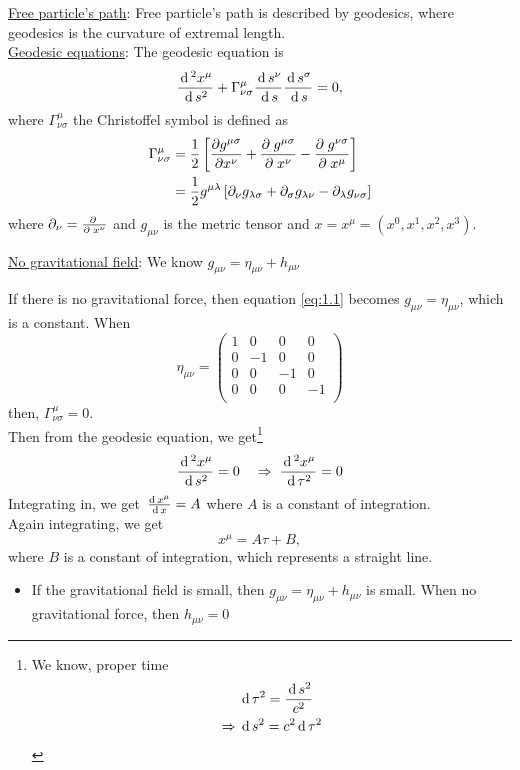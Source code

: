 \documentclass[../main-sheet.tex]{subfiles}
\begin{document}
\begin{soln}
    \underline{Free particle's path}: Free particle's path is described by geodesics, where geodesics is the curvature of extremal length.\\
    \underline{Geodesic equations}: The geodesic equation is
    \[
        \frac{\,\mathrm{d}\,^2 x^\mu}{\,\mathrm{d}\, s^2}+\Gamma^\mu_{\nu\sigma}\frac{\,\mathrm{d}\, s^\nu}{\,\mathrm{d}\, s}\frac{\,\mathrm{d}\, s^\sigma}{\,\mathrm{d}\, s}=0,
        \]
        where \(\Gamma^\mu_{\nu\sigma}\) the Christoffel symbol is defined as
        \begin{align*}
            \Gamma^\mu_{\nu\sigma}&=\frac{1}{2}\left[ \frac{\partial g^{\mu\sigma}}{\partial x^\nu}+\frac{\partial\;g^{\mu\sigma}}{\partial\; x^\nu}-\frac{\partial\;g^{\nu\sigma}}{\partial\; x^\mu} \right]\\
            &=\frac{1}{2}g^{\mu\lambda}\left[ \partial_\nu g_{\lambda\sigma}+\partial_\sigma{g_{\lambda\nu}}-\partial_\lambda{g_{\nu\sigma}} \right]
        \end{align*} 
        where \(\partial_\nu=\frac{\partial\;}{\partial\; x^\nu}\) and \(g_{\mu\nu}\) is the metric tensor and \(x = x^\mu= (x^0, x^1, x^2, x^3)\).


\underline{No gravitational field}: We know \(g_{\mu\nu}=\eta_{\mu\nu}+h_{\mu\nu}\)

If there is no gravitational force, then equation \eqref{eq:1.1} becomes \(g_{\mu\nu}=\eta_{\mu\nu}\), which is a constant. When
\[
    \eta_{\mu\nu}=
    \begin{pmatrix}
        1 & 0 & 0 & 0 \\
        0 & -1 & 0 & 0 \\
        0 & 0 & -1 & 0 \\
        0 & 0 & 0 & -1 \\
\end{pmatrix}
\]
then, \(\Gamma^\mu_{\nu\sigma}=0\).\\
Then from the geodesic equation, we get\footnote{We know, proper time \begin{align*}
    & \,\mathrm{d}\, \tau^2=\frac{\,\mathrm{d}\, s^2}{c^2}\\
    \Rightarrow\;& \,\mathrm{d}\, s^2={c^2}\,\mathrm{d}\, \tau^2
\end{align*}}
\[\frac{\,\mathrm{d}\,^2 x^\mu}{\,\mathrm{d}\, s^2}=0\quad \Rightarrow\;\frac{\,\mathrm{d}\,^2 x^\mu}{\,\mathrm{d}\, \tau^2}=0\]
Integrating in, we get \(\,\frac{\mathrm{d}\,x^\mu}{\mathrm{d}\,x}=A\) where \(A\) is a constant of integration.\\ 
Again integrating, we get
\[x^\mu = A\tau + B,\]
where \(B\) is a constant of integration, which represents a straight line.
\end{soln}
\begin{itemize}
    \item If the gravitational field is small, then \(g_{\mu\nu}=\eta_{\mu\nu}+h_{\mu\nu}\) is small. When no gravitational force, then \(h_{\mu\nu}=0\)
\end{itemize}
\end{document}
